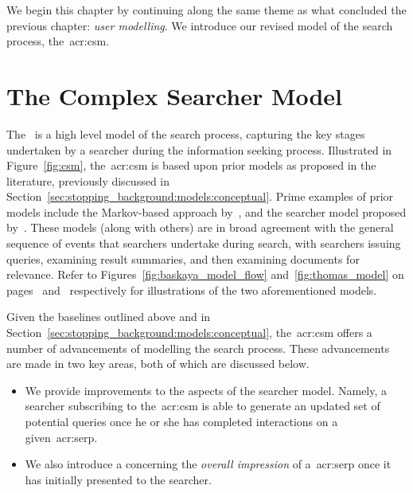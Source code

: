 We begin this chapter by continuing along the same theme as what concluded the previous chapter: \emph{user modelling}. We introduce our revised model of the search process, the~\gls{acr:csm}.

\section{The Complex Searcher Model}\label{sec:proposal:csm}
The~ is a high level model of the search process, capturing the key stages undertaken by a searcher during the information seeking process. Illustrated in Figure~\ref{fig:csm}, the~\gls{acr:csm} is based upon prior models as proposed in the literature, previously discussed in Section~\ref{sec:stopping_background:models:conceptual}. Prime examples of prior models include the Markov-based approach by~\cite{baskaya2013behavioural_factors}, and the searcher model proposed by~\cite{thomas2014modelling_behaviour}. These models (along with others) are in broad agreement with the general sequence of events that searchers undertake during search, with searchers issuing queries, examining result summaries, and then examining documents for relevance. Refer to Figures~\ref{fig:baskaya_model_flow} and~\ref{fig:thomas_model} on pages~\pageref{fig:baskaya_model_flow} and~\pageref{fig:thomas_model} respectively for illustrations of the two aforementioned models.

Given the baselines outlined above and in Section~\ref{sec:stopping_background:models:conceptual}, the~\gls{acr:csm} offers a number of advancements of modelling the search process. These advancements are made in two key areas, both of which are discussed below.

\begin{itemize}
    \item{We provide improvements to the  aspects of the searcher model. Namely, a searcher subscribing to the~\gls{acr:csm} is able to generate an updated set of potential queries once he or she has completed interactions on a given~\gls{acr:serp}.}
    \item{We also introduce a  concerning the \emph{overall impression} of a~\gls{acr:serp} once it has initially presented to the searcher.}
\end{itemize}

